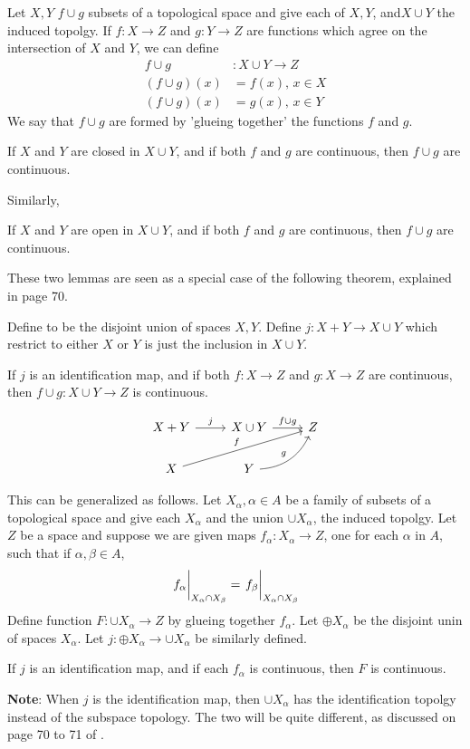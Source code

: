 \documentclass{article}
\begin{document}
\begin{defi}[$f\cup g$]
    Let $X,Y$ $f\cup g$ subsets of a topological space and give each of
    $X,Y$, and$X\cup Y$ the induced topolgy. If $f:X\to Z$ and
    $g:Y\to Z$ are functions which agree on the intersection of $X$
    and $Y$, we can define
    \begin{align}
        f\cup g &: X\cup Y \to Z  \\
        (f\cup g)(x) &= f(x),\, x\in X \nonumber \\
        (f\cup g)(x) &= g(x),\, x\in Y \nonumber
    \end{align}
    We say that $f\cup g$ are formed by 'glueing together' the
    functions $f$ and $g$.
\end{defi}
\begin{lemma}
    If $X$ and $Y$ are closed in $X\cup Y$, and if both $f$ and $g$
    are continuous, then $f\cup g$ are continuous.
\end{lemma}
Similarly, 
\begin{lemma}
    If $X$ and $Y$ are open in $X\cup Y$, and if both $f$ and $g$
    are continuous, then $f\cup g$ are continuous.
\end{lemma}

These two lemmas are seen as a special case of the following theorem,
explained in page 70.

Define  to be the disjoint union of spaces $X,Y$. Define
$j:X+Y \to X\cup Y$ which restrict to either $X$ or $Y$ is just the
inclusion in $X\cup Y$.
\begin{thm}
    If $j$ is an identification map, and if both $f:X\to Z$ and
    $g:X\to Z$ are continuous, then $f\cup g:X\cup Y\to Z$ is
    continuous.
\end{thm}
$$ \begin{tikzcd}[]
    X+Y \ar[r,"j"] & X\cup Y\ar[r,"f\cup g"] & Z \\
    X\ar[rru,"f"] & Y\ar[ru,"g",bend right]
\end{tikzcd}$$

This can be generalized as follows. Let $X_\alpha,\alpha\in A$ be a
family of subsets of a topological space and give each $X_\alpha$ and
the union $\cup X_\alpha$, the induced topolgy. Let $Z$ be a space and
suppose we are given maps $f_\alpha:X_\alpha\to Z$, one for each
$\alpha$ in $A$, such that if $\alpha,\beta\in A$,
$$ 
\eval{f_\alpha}_{X_\alpha\cap X_\beta} = \eval{f_\beta}_{X_\alpha\cap X_\beta}
$$
Define function $F:\cup X_\alpha\to Z$ by glueing together $f_\alpha$.
Let $\oplus X_\alpha$ be the disjoint unin of spaces $X_\alpha$. Let
$j:\oplus X_\alpha \to \cup X_\alpha$ be similarly defined.
\begin{thm}
    If $j$ is an identification map, and if each $f_\alpha$
    is continuous, then $F$ is continuous.
\end{thm}
\textbf{Note}: When $j$ is the identification map, then $\cup
X_\alpha$ has the identification topolgy instead of the subspace
topology. The two will be quite different, as discussed on page 70 to
71 of \cite{book}.
\end{document}
